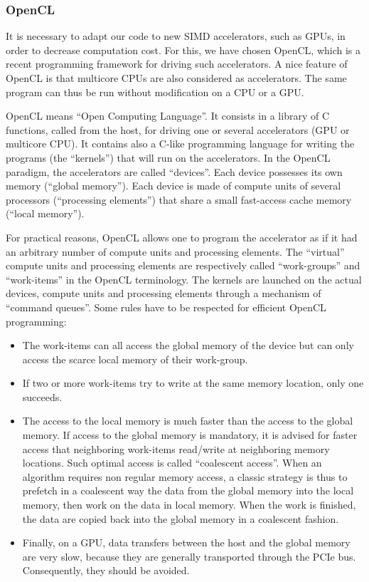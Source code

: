 \documentclass[12pt]{amsart}
\begin{document}
\subsubsection{OpenCL}
It is necessary to adapt our code to new SIMD accelerators, such as GPUs, in order to decrease computation cost. For this, we have chosen OpenCL, which is a recent programming framework for driving such accelerators. A nice feature of OpenCL is that multicore CPUs are also considered as accelerators. The same program can thus be run without modification on a CPU or a GPU.

OpenCL means ``Open Computing Language''. It consists in a library of C functions, called from the host, for driving one or several accelerators (GPU or multicore CPU). It contains also a C-like programming language for writing the programs (the ``kernels'') that will run on the accelerators. In the OpenCL paradigm, the accelerators are called ``devices''. Each device possesses its own memory (``global memory''). Each device is made of compute units of several processors (``processing elements'') that share a small fast-access cache memory (``local memory'').

For practical reasons, OpenCL allows one to program the accelerator as if it had an arbitrary number of compute units and processing elements. The ``virtual'' compute units and processing elements are respectively called ``work-groups'' and ``work-items'' in the OpenCL terminology.  The kernels are launched on the actual devices, compute units and processing elements through a mechanism of ``command queues''. Some rules have to be respected for efficient OpenCL programming:
\begin{itemize}
\item  The work-items can all access the global memory of the device but can only access the scarce local memory of their work-group.
\item If two or more work-items try to write at the same memory location, only one succeeds.
\item The access to the local memory is much faster than the access to the global memory. If access to the global memory is mandatory, it is advised for faster access that neighboring work-items read/write at neighboring memory locations. Such optimal access is called ``coalescent access''. When an algorithm requires non regular memory access, a classic strategy is thus to prefetch in a coalescent way the data from the global memory into the local memory, then work on the data in local memory. When the work is finished, the data are copied back into the global memory in a coalescent fashion.
\item Finally, on a GPU, data transfers between the host and the global memory are very slow, because they are generally transported through the PCIe bus. Consequently, they should be avoided.
\end{itemize}
\end{document}
